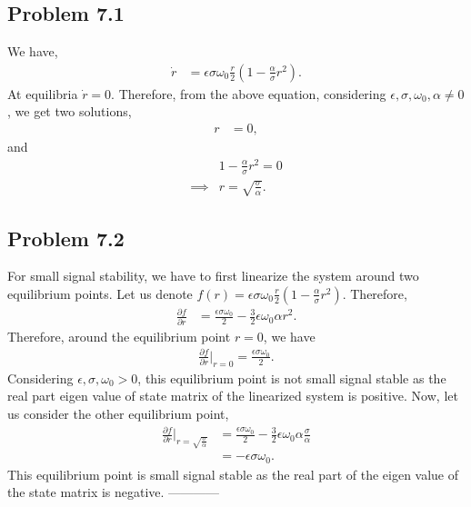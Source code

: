 \subsection*{Problem 7.1}
We have,
\begin{align}\label{eq:q7_non_lin}
	\dot{r} &= \epsilon\sigma\omega_0\frac{r}{2}\left(1-\frac{\alpha}{\sigma}r^2\right).
\end{align}
At equilibria $\dot{r} = 0$. Therefore, from the above equation, considering $\epsilon,\sigma,\omega_0,\alpha \neq 0$, we get two solutions,
\begin{align*}
	r &= 0,
\end{align*}
and
\begin{align*}
	& 1-\frac{\alpha}{\sigma}r^2 = 0\\
	\implies & r = \sqrt{\frac{\sigma}{\alpha}}.
\end{align*}
\subsection*{Problem 7.2}
For small signal stability, we have to first linearize the system around two equilibrium points. Let us denote $f(r) = \epsilon\sigma\omega_0\frac{r}{2}\left(1-\frac{\alpha}{\sigma}r^2\right)$. Therefore,
\begin{align*}
	\frac{\partial f}{\partial r} &= \frac{\epsilon\sigma\omega_0}{2}-\frac{3}{2}\epsilon\omega_0\alpha r^2.
\end{align*}
Therefore, around the equilibrium point $r=0$, we have
\begin{align*}
	\frac{\partial f}{\partial r}|_{r=0} = \frac{\epsilon\sigma\omega_0}{2}.
\end{align*}
Considering $\epsilon,\sigma,\omega_0 > 0$, this equilibrium point is not small signal stable as the real part eigen value of state matrix of the linearized system is positive. Now, let us consider the other equilibrium point,
\begin{align*}
	\frac{\partial f}{\partial r}|_{r=\sqrt{\frac{\sigma}{\alpha}}} &= \frac{\epsilon\sigma\omega_0}{2} - \frac{3}{2}\epsilon\omega_0\alpha\frac{\sigma}{\alpha}\\
	&= -\epsilon\sigma\omega_0.
\end{align*}
This equilibrium point is small signal stable as the real part of the eigen value of the state matrix is negative.
------------
